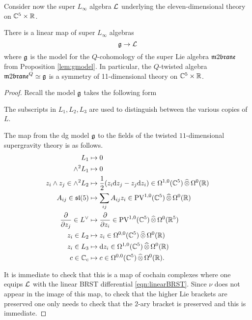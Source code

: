 \parsec[s:residual]
Consider now the super $L_\infty$ algebra $\mathcal L$ underlying the eleven-dimensional theory on $\mathbb C^5 \times \mathbb R$. 

\begin{prop}
There is a linear map of super $L_\infty$ algebras 
\[
\mathfrak g \to \mathcal L 
\]
where $\mathfrak g$ is the model for the $Q$-cohomology of the super Lie algebra $\m2$ from Proposition \ref{lem:gmodel}. 
In particular, the $Q$-twisted algebra $\m2^Q \simeq \fg$ is a symmetry of 11-dimensional theory on $\mathbb C^5 \times \mathbb R$. 
\end{prop}
\begin{proof}
Recall the model $\mathfrak g$ takes the following form
\beqn 
{}
\eeqn
The subscripts in $L_1, L_2, L_3$ are used to distinguish between the various copies of $L$.

The map from the dg model $\mathfrak g$ to the fields of the twisted $11$-dimensional supergravity theory is as follows. 
\begin{align*}
 L_1 & \mapsto 0 \\
 \wedge^2 L_1 & \mapsto 0 \\
z_i \wedge z_j \in \wedge^2 L_2 & \mapsto \frac12 (z_i {\rm d} z_j - z_j {\rm d} z_i) \in \Omega^{1,0} (\mathbb C^5) \, \widehat{\otimes} \, \Omega^0 (\mathbb R) \\
A_{ij} \in \mathfrak{sl}(5) & \mapsto \sum_{ij} A_{ij} z_i \in {\rm PV}^{1,0}(\mathbb C^5) \, \widehat{\otimes} \, \Omega^0(\mathbb R) \\\frac{\partial}{\partial z_j} \in L^\vee & \mapsto
\frac{\partial}{\partial z_i} \in {\rm PV}^{1,0} (\mathbb C^5) \, \widehat{\otimes} \, \Omega^0 (\mathbb R^5) \\ z_i \in L_2 & \mapsto z_i \in \Omega^{0,0}(\mathbb C^5) \, \widehat{\otimes} \, \Omega^0 (\mathbb R) \\
z_i \in L_3 & \mapsto {\rm d} z_i \in \Omega^{1,0}(\mathbb C^5) \, \widehat{\otimes} \, \Omega^0 (\mathbb R) \\
c \in \mathbb C_c & \mapsto c \in \Omega^{0,0}(\mathbb C^5) \, \widehat{\otimes} \, \Omega^0 (\mathbb R) .
\end{align*}

It is immediate to check that this is a map of cochain complexes where one equips $\mathcal L$ with the linear BRST differential \eqref{eqn:linearBRST}.
Since $\nu$ does not appear in the image of this map, to check that the higher Lie brackets are preserved one only needs to check that the $2$-ary bracket is preserved and this is immediate. 
\end{proof}


